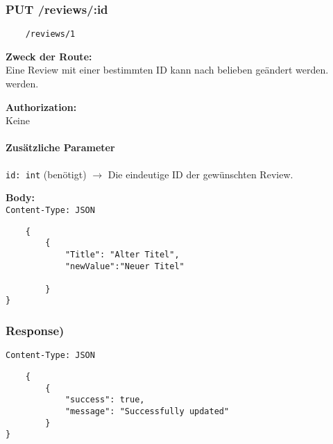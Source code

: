 \pagebreak


\subsubsection{PUT /reviews/:id}

\begin{lstlisting}
    /reviews/1
\end{lstlisting}

\textbf{Zweck der Route:} \\
Eine Review mit einer bestimmten ID kann nach belieben geändert werden.
werden.

\textbf{Authorization:} \\
Keine

\paragraph{Zusätzliche Parameter}
\lstinline{id: int} (benötigt)
$\rightarrow$ Die eindeutige ID der gewünschten Review.

\textbf{Body:}\\
\lstinline{Content-Type: JSON}
\begin{lstlisting}
    {
        {
            "Title": "Alter Titel",
            "newValue":"Neuer Titel"

        }
}
\end{lstlisting}

\subsubsection{Response)}

\lstinline{Content-Type: JSON}
\begin{lstlisting}
    {
        {
            "success": true,
            "message": "Successfully updated"
        }
}
\end{lstlisting}


\pagebreak

